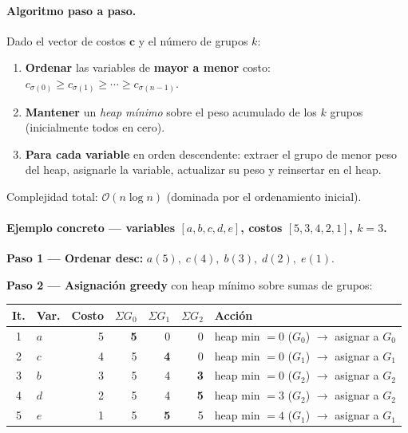 \documentclass[12pt,letterpaper]{article}
\theoremstyle{definition}
\theoremstyle{remark}
\newcommand{\BigO}[1]{\mathcal{O}(#1)}
\begin{document}
\paragraph{Algoritmo paso a paso.}
Dado el vector de costos $\mathbf{c}$ y el número de grupos $k$:
\begin{enumerate}
  \item \textbf{Ordenar} las variables de \textbf{mayor a menor} costo:
    $c_{\sigma(0)} \geq c_{\sigma(1)} \geq \cdots \geq c_{\sigma(n-1)}$.
  \item \textbf{Mantener} un \emph{heap mínimo} sobre el peso acumulado de los $k$ grupos
    (inicialmente todos en cero).
  \item \textbf{Para cada variable} en orden descendente:
    extraer el grupo de menor peso del heap, asignarle la variable,
    actualizar su peso y reinsertar en el heap.
\end{enumerate}
Complejidad total: $\BigO{n \log n}$ (dominada por el ordenamiento inicial).

\paragraph{Ejemplo concreto --- variables $[a,b,c,d,e]$, costos $[5,3,4,2,1]$, $k=3$.}

\textbf{Paso 1 --- Ordenar desc:} $a(5),\; c(4),\; b(3),\; d(2),\; e(1)$.

\textbf{Paso 2 --- Asignación greedy} con heap mínimo sobre sumas de grupos:

\begin{center}
\begin{tabular}{@{}c l r r r r p{4.2cm}@{}}
\toprule
\textbf{It.} & \textbf{Var.} & \textbf{Costo} &
$\Sigma G_0$ & $\Sigma G_1$ & $\Sigma G_2$ & \textbf{Acción} \\
\midrule
1 & $a$ & 5 & \textbf{5} & 0 & 0 &
  heap min $= 0$ ($G_0$) $\to$ asignar a $G_0$ \\
2 & $c$ & 4 & 5 & \textbf{4} & 0 &
  heap min $= 0$ ($G_1$) $\to$ asignar a $G_1$ \\
3 & $b$ & 3 & 5 & 4 & \textbf{3} &
  heap min $= 0$ ($G_2$) $\to$ asignar a $G_2$ \\
4 & $d$ & 2 & 5 & 4 & \textbf{5} &
  heap min $= 3$ ($G_2$) $\to$ asignar a $G_2$ \\
5 & $e$ & 1 & 5 & \textbf{5} & 5 &
  heap min $= 4$ ($G_1$) $\to$ asignar a $G_1$ \\
\bottomrule
\end{tabular}
\end{center}
\end{document}
